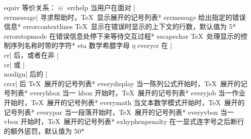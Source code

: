 \capcs equiv {等价关系：$\equiv$}{}{}
\capcs errhelp {当用户在面对 |\\errmessage| 寻求帮助时，\TeX\ 显示展开的记号列表}*{}
\capcs errmessage {给出指定的错误信息}*{}
\capcs errorcontextlines {\TeX\ 显示在错误时显示的上下文的行数，默认值为 5}*{}
\capcs errorstopmode {在错误信息处停下来等待交互过程}*{}
\capcs escapechar {\TeX\ 处理显示的控制序列名称时带的字符}*{}
\capcs eta {数学希腊字母 $\eta$}{}{}
\capcs everycr {在 |\\cr| 后，或者在非 |\\cr| 或 |\\noalign| 后的 |\\crcr| 后 \TeX\ 展开的记号列表}*{}
\capcs everydisplay {当一陈列公式开始时，\TeX\ 展开的记号列表}*{}
\capcs everyhbox {当一 hbox 开始时，\TeX\ 展开的记号列表}*{}
\capcs everyjob {当一作业开始时，\TeX\ 展开的记号列表}*{}
\capcs everymath {当文本数学模式开始时，\TeX\ 展开的记号列表}*{}
\capcs everypar {当一段落开始时，\TeX\ 展开的记号列表}*{}
\capcs everyvbox {当一 vbox 开始时，\TeX\ 展开的记号列表}*{}
\capcs exhyphenpenalty {在一显式连字号之后断行的额外惩罚，默认值为 50}*{}
